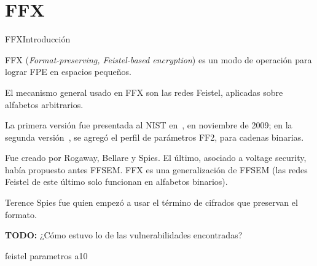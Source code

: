 %
%

\section{FFX}

\begin{frame}{FFX}{Introducción}

  FFX (\textit{Format-preserving, Feistel-based encryption}) es un modo de
  operación para lograr FPE en espacios pequeños.

  El mecanismo general usado en FFX son las redes Feistel, aplicadas sobre
  alfabetos arbitrarios.

  La primera versión fue presentada al NIST en~\cite{ffx_1}, en noviembre de
  2009; en la segunda versión~\cite{ffx_2}, se agregó el perfil de parámetros
  FF2, para cadenas binarias.

  \note
  {
    Fue creado por Rogaway, Bellare y Spies. El último, asociado a voltage
    security, había propuesto antes FFSEM. FFX es una generalización de
    FFSEM (las redes Feistel de este último solo funcionan en alfabetos
    binarios).

    Terence Spies fue quien empezó a usar el término de cifrados que preservan
    el formato.

    \textbf{TODO:} ¿Cómo estuvo lo de las vulnerabilidades encontradas?
  }

\end{frame}

{feistel}
{parametros}
{a10}
